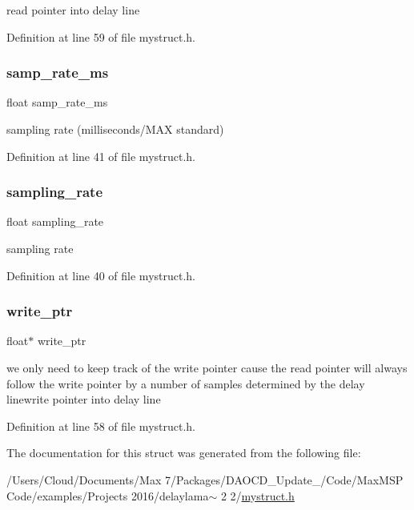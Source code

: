 read pointer into delay line 

Definition at line 59 of file mystruct.\+h.

\mbox{\label{struct__delaylama_ad06216daf396171bc5906c9385caf5a9}} 
\subsubsection{\texorpdfstring{samp\+\_\+rate\+\_\+ms}{samp\_rate\_ms}}
{\footnotesize\ttfamily float samp\+\_\+rate\+\_\+ms}

sampling rate (milliseconds/\+M\+AX standard) 

Definition at line 41 of file mystruct.\+h.

\mbox{\label{struct__delaylama_a8d632437c1878f0244e942c89b3b99f9}} 
\subsubsection{\texorpdfstring{sampling\+\_\+rate}{sampling\_rate}}
{\footnotesize\ttfamily float sampling\+\_\+rate}

sampling rate 

Definition at line 40 of file mystruct.\+h.

\mbox{\label{struct__delaylama_ac202512892d631747b5ef0c98de0367b}} 
\subsubsection{\texorpdfstring{write\+\_\+ptr}{write\_ptr}}
{\footnotesize\ttfamily float$\ast$ write\+\_\+ptr}

we only need to keep track of the write pointer cause the read pointer will always follow the write pointer by a number of samples determined by the delay linewrite pointer into delay line 

Definition at line 58 of file mystruct.\+h.



The documentation for this struct was generated from the following file\+:\begin{DoxyCompactItemize}
\item 
/\+Users/\+Cloud/\+Documents/\+Max 7/\+Packages/\+D\+A\+O\+C\+D\+\_\+\+Update\+\_/\+Code/\+Max\+M\+S\+P Code/examples/\+Projects 2016/delaylama$\sim$ 2 2/\mbox{\hyperlink{mystruct_8h}{mystruct.\+h}}\end{DoxyCompactItemize}
